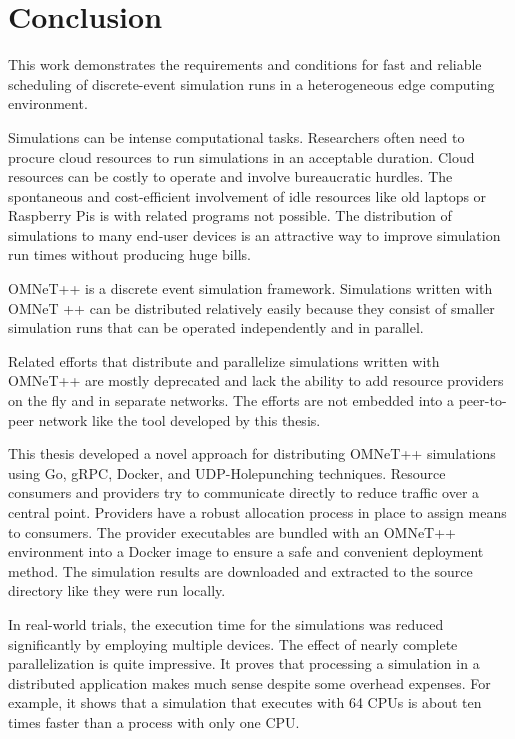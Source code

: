 \chapter{Conclusion}

This work demonstrates the requirements and conditions for fast and reliable scheduling of discrete-event simulation runs in a heterogeneous edge computing environment.

Simulations can be intense computational tasks. Researchers often need to procure cloud resources to run simulations in an acceptable duration. Cloud resources can be costly to operate and involve bureaucratic hurdles. The spontaneous and cost-efficient involvement of idle resources like old laptops or Raspberry Pis is with related programs not possible. The distribution of simulations to many end-user devices is an attractive way to improve simulation run times without producing huge bills. 

OMNeT++ is a discrete event simulation framework. Simulations written with OMNeT ++ can be distributed relatively easily because they consist of smaller simulation runs that can be operated independently and in parallel.

Related efforts that distribute and parallelize simulations written with OMNeT++ are mostly deprecated and lack the ability to add resource providers on the fly and in separate networks. The efforts are not embedded into a peer-to-peer network like the tool developed by this thesis.

This thesis developed a novel approach for distributing OMNeT++ simulations using Go, gRPC, Docker, and UDP-Holepunching techniques. 
Resource consumers and providers try to communicate directly to reduce traffic over a central point. Providers have a robust allocation process in place to assign means to consumers. The provider executables are bundled with an OMNeT++ environment into a Docker image to ensure a safe and convenient deployment method. The simulation results are downloaded and extracted to the source directory like they were run locally.

In real-world trials, the execution time for the simulations was reduced significantly by employing multiple devices. The effect of nearly complete parallelization is quite impressive. It proves that processing a simulation in a distributed application makes much sense despite some overhead expenses. For example, it shows that a simulation that executes with 64 CPUs is about ten times faster than a process with only one CPU. 

